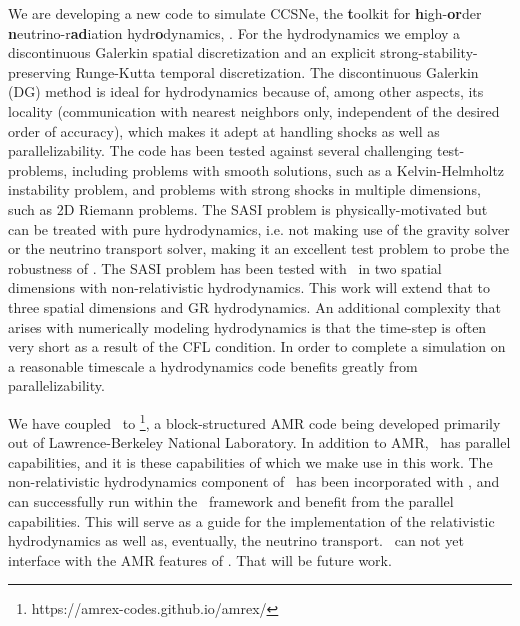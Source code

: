 We are developing a new code to simulate CCSNe,
the \textbf{t}oolkit for \textbf{h}igh-\textbf{or}der
\textbf{n}eutrino-r\textbf{ad}iation hydr\textbf{o}dynamics, \thornado.
For the hydrodynamics we employ a discontinuous Galerkin spatial discretization
\citep{cs1998} and an explicit strong-stability-preserving Runge-Kutta temporal
discretization.
The discontinuous Galerkin (DG) method is ideal for hydrodynamics because of,
among other aspects, its locality (communication with nearest neighbors only,
independent of the desired order of accuracy),
which makes it adept at handling shocks as well as parallelizability.
The code has been tested against several challenging test-problems,
including problems with smooth solutions, such as a Kelvin-Helmholtz
instability problem, and problems with strong shocks in multiple dimensions,
such as 2D Riemann problems.
The SASI problem is physically-motivated but can be treated with
pure hydrodynamics, i.e. not making use of the gravity solver or the
neutrino transport solver,
making it an excellent test problem to probe the robustness of \thornado.
The SASI problem has been tested with \thornado\ in two spatial dimensions
with non-relativistic hydrodynamics.
This work will extend that to three spatial dimensions and GR hydrodynamics.
An additional complexity that arises with numerically modeling hydrodynamics
is that the time-step is often very short as a result of the CFL condition.
In order to complete a simulation on a reasonable timescale a
hydrodynamics code benefits greatly from parallelizability.

We have coupled \thornado\ to
\amrex\footnote{https://amrex-codes.github.io/amrex/},
a block-structured AMR code being developed primarily out of
Lawrence-Berkeley National Laboratory.
In addition to AMR, \amrex\ has parallel capabilities, and it is these
capabilities of which we make use in this work.
The non-relativistic hydrodynamics component of \thornado\ has been
incorporated with \amrex, and can successfully run within the
\amrex\ framework and benefit from the parallel capabilities.
This will serve as a guide for the implementation of the
relativistic hydrodynamics as well as, eventually, the neutrino transport.
\thornado\ can not yet interface with the AMR features of \amrex.
That will be future work.

